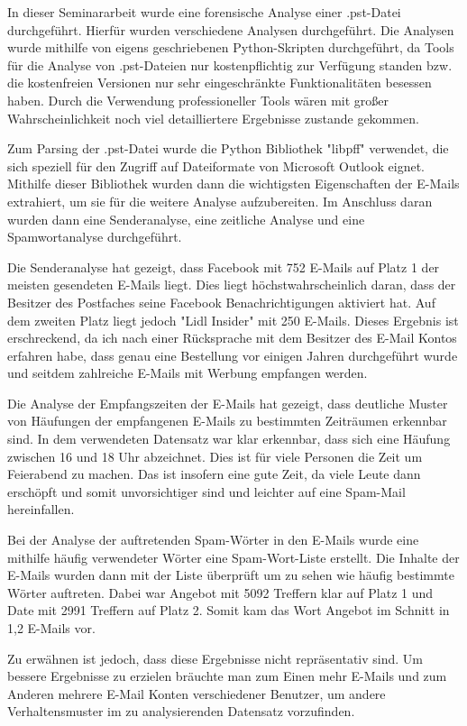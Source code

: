 In dieser Seminararbeit wurde eine forensische Analyse einer .pst-Datei durchgeführt. Hierfür wurden verschiedene Analysen durchgeführt. Die Analysen wurde mithilfe von eigens geschriebenen Python-Skripten durchgeführt, da Tools für die Analyse von .pst-Dateien nur kostenpflichtig zur Verfügung standen bzw. die kostenfreien Versionen nur sehr eingeschränkte Funktionalitäten besessen haben. Durch die Verwendung professioneller Tools wären mit großer Wahrscheinlichkeit noch viel detailliertere Ergebnisse zustande gekommen. 

Zum Parsing der .pst-Datei wurde die Python Bibliothek "libpff" verwendet, die sich speziell für den Zugriff auf Dateiformate von Microsoft Outlook eignet. Mithilfe dieser Bibliothek wurden dann die wichtigsten Eigenschaften der E-Mails extrahiert, um sie für die weitere Analyse aufzubereiten. Im Anschluss daran wurden dann eine Senderanalyse, eine zeitliche Analyse und eine Spamwortanalyse durchgeführt. 

Die Senderanalyse hat gezeigt, dass Facebook mit 752 E-Mails auf Platz 1 der meisten gesendeten E-Mails liegt. Dies liegt höchstwahrscheinlich daran, dass der Besitzer des Postfaches seine Facebook Benachrichtigungen aktiviert hat. Auf dem zweiten Platz liegt jedoch "Lidl Insider" mit 250 E-Mails. Dieses Ergebnis ist erschreckend, da ich nach einer Rücksprache mit dem Besitzer des E-Mail Kontos erfahren habe, dass genau eine Bestellung vor einigen Jahren durchgeführt wurde und seitdem zahlreiche E-Mails mit Werbung empfangen werden. 

Die Analyse der Empfangszeiten der E-Mails hat gezeigt, dass deutliche Muster von Häufungen der empfangenen E-Mails zu bestimmten Zeiträumen erkennbar sind. In dem verwendeten Datensatz war klar erkennbar, dass sich eine Häufung zwischen 16 und 18 Uhr abzeichnet. Dies ist für viele Personen die Zeit um Feierabend zu machen. Das ist insofern eine gute Zeit, da viele Leute dann erschöpft und somit unvorsichtiger sind und leichter auf eine Spam-Mail hereinfallen. 

Bei der Analyse der auftretenden Spam-Wörter in den E-Mails wurde eine mithilfe häufig verwendeter Wörter eine \glqq{}Spam-Wort-Liste\grqq{} erstellt. Die Inhalte der E-Mails wurden dann mit der Liste überprüft um zu sehen wie häufig bestimmte Wörter auftreten. Dabei war \glqq{}Angebot\grqq{} mit 5092 Treffern klar auf Platz 1 und \glqq{}Date\grqq{} mit 2991 Treffern auf Platz 2. Somit kam das Wort Angebot im Schnitt in 1,2 E-Mails vor. 

Zu erwähnen ist jedoch, dass diese Ergebnisse nicht repräsentativ sind. Um bessere Ergebnisse zu erzielen bräuchte man zum Einen mehr E-Mails und zum Anderen mehrere E-Mail Konten verschiedener Benutzer, um andere Verhaltensmuster im zu analysierenden Datensatz vorzufinden.